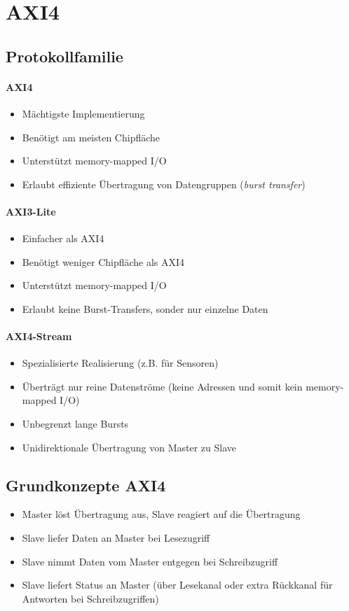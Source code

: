 	\section{AXI4}
		\subsection{Protokollfamilie}
			\paragraph{AXI4}
				\begin{itemize}
					\item Mächtigste Implementierung
					\item Benötigt am meisten Chipfläche
					\item Unterstützt memory-mapped I/O
					\item Erlaubt effiziente Übertragung von Datengruppen (\textit{burst transfer})
				\end{itemize}
			
			\paragraph{AXI3-Lite}
				\begin{itemize}
					\item Einfacher als AXI4
					\item Benötigt weniger Chipfläche als AXI4
					\item Unterstützt memory-mapped I/O
					\item Erlaubt keine Burst-Transfers, sonder nur einzelne Daten
				\end{itemize}
			
			\paragraph{AXI4-Stream}
				\begin{itemize}
					\item Spezialisierte Realisierung (z.B. für Sensoren)
					\item Überträgt nur reine Datenströme (keine Adressen und somit kein memory-mapped I/O)
					\item Unbegrenzt lange Bursts
					\item Unidirektionale Übertragung von Master zu Slave
				\end{itemize}
		
		\subsection{Grundkonzepte AXI4}
			\begin{itemize}
				\item Master löst Übertragung aus, Slave reagiert auf die Übertragung
				\item Slave liefer Daten an Master bei Lesezugriff
				\item Slave nimmt Daten vom Master entgegen bei Schreibzugriff
				\item Slave liefert Status an Master (über Lesekanal oder extra Rückkanal für Antworten bei Schreibzugriffen)
			\end{itemize}
			
